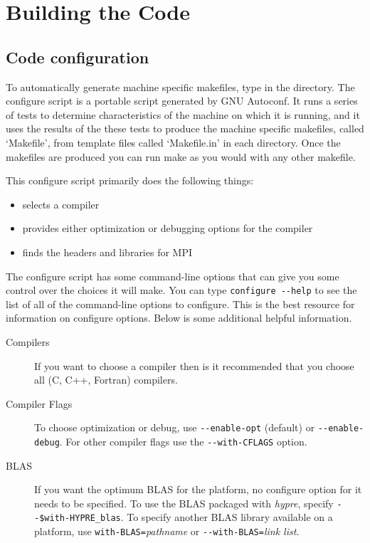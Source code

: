 \chapter{Building the Code}
\section{Code configuration}

To automatically generate machine specific makefiles, type
 in the  directory.  The configure
script is a portable script generated by GNU Autoconf.  It runs a
series of tests to determine characteristics of the machine on which
it is running, and it uses the results of the these tests to produce
the machine specific makefiles, called `Makefile', from template files
called `Makefile.in' in each directory.  Once the makefiles are
produced you can run make as you would with any other makefile.

This configure script primarily does the following things:
\begin{itemize}
\item selects a compiler
\item provides either optimization or debugging options for the compiler
\item finds the headers and libraries for MPI
\end{itemize}

The configure script has some command-line options that can give you
some control over the choices it will make.  You can type
\verb+configure --help+
to see the list of all of the command-line options to configure. This is
the best resource for information on configure options.  Below is some
additional helpful information.


\begin{description}

\item[Compilers] If you want to choose a compiler then is it recommended
that you choose all (C, C++, Fortran) compilers.

\item[Compiler Flags] To choose optimization or debug, use
\verb+--enable-opt+ (default) or \verb+--enable-debug+.
For other compiler flags use the \verb+--with-CFLAGS+ option.  

\item[BLAS] If you want the optimum BLAS for the platform,
no configure option for it needs to be specified.
To use the BLAS packaged with {\slshape hypre},
specify \verb+--$with-HYPRE_blas+.
To specify another BLAS library available on a
platform, use \verb+with-BLAS=+{\itshape pathname} or
\verb+--with-BLAS=+{\itshape link list}.

\end{description}

